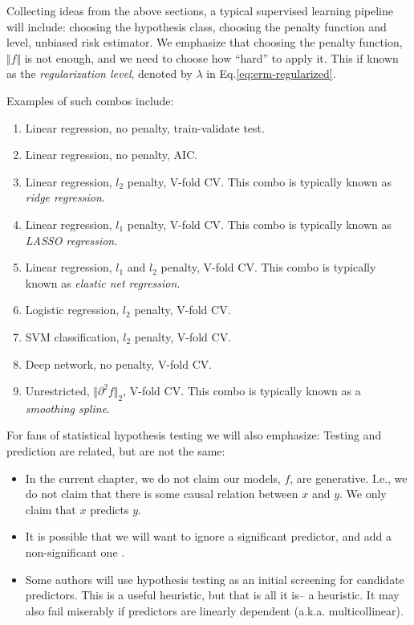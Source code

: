 \documentclass[]{book}
\providecommand{\tightlist}{%
  \setlength{\itemsep}{0pt}\setlength{\parskip}{0pt}}
\theoremstyle{definition}
\theoremstyle{definition}
\theoremstyle{definition}
\theoremstyle{remark}
\begin{document}
Collecting ideas from the above sections, a typical supervised learning
pipeline will include: choosing the hypothesis class, choosing the
penalty function and level, unbiased risk estimator. We emphasize that
choosing the penalty function, \(\Vert f \Vert\) is not enough, and we
need to choose how ``hard'' to apply it. This if known as the
\emph{regularization level}, denoted by \(\lambda\) in
Eq.\eqref{eq:erm-regularized}.

Examples of such combos include:

\begin{enumerate}
\def\labelenumi{\arabic{enumi}.}
\tightlist
\item
  Linear regression, no penalty, train-validate test.
\item
  Linear regression, no penalty, AIC.
\item
  Linear regression, \(l_2\) penalty, V-fold CV. This combo is typically
  known as \emph{ridge regression}.
\item
  Linear regression, \(l_1\) penalty, V-fold CV. This combo is typically
  known as \emph{LASSO regression}.
\item
  Linear regression, \(l_1\) and \(l_2\) penalty, V-fold CV. This combo
  is typically known as \emph{elastic net regression}.
\item
  Logistic regression, \(l_2\) penalty, V-fold CV.
\item
  SVM classification, \(l_2\) penalty, V-fold CV.
\item
  Deep network, no penalty, V-fold CV.
\item
  Unrestricted, \(\Vert \partial^2 f \Vert_2\), V-fold CV. This combo is
  typically known as a \emph{smoothing spline}.
\end{enumerate}

For fans of statistical hypothesis testing we will also emphasize:
Testing and prediction are related, but are not the same:

\begin{itemize}
\tightlist
\item
  In the current chapter, we do not claim our models, \(f\), are
  generative. I.e., we do not claim that there is some causal relation
  between \(x\) and \(y\). We only claim that \(x\) predicts \(y\).
\item
  It is possible that we will want to ignore a significant predictor,
  and add a non-significant one \citep{foster2004variable}.
\item
  Some authors will use hypothesis testing as an initial screening for
  candidate predictors. This is a useful heuristic, but that is all it
  is-- a heuristic. It may also fail miserably if predictors are
  linearly dependent (a.k.a. multicollinear).
\end{itemize}
\end{document}
